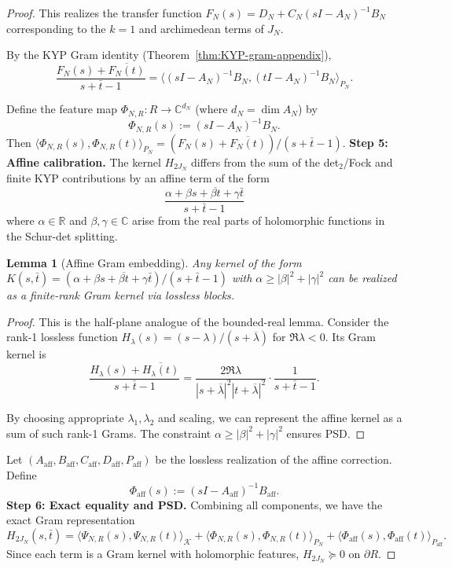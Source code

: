\documentclass[11pt]{article}
\newtheorem{lemma}[theorem]{Lemma}
\theoremstyle{definition}
\theoremstyle{remark}
\begin{document}
\begin{proof}
This realizes the transfer function $F_N(s) = D_N + C_N(sI - A_N)^{-1}B_N$ corresponding to the $k=1$ and archimedean terms of $J_N$.

By the KYP Gram identity (Theorem~\ref{thm:KYP-gram-appendix}),
\[
  \frac{F_N(s) + \overline{F_N(t)}}{s + \bar t - 1} = \langle (sI - A_N)^{-1}B_N, (tI - A_N)^{-1}B_N \rangle_{P_N}.
\]

Define the feature map $\Phi_{N,R}: R \to \mathbb{C}^{d_N}$ (where $d_N = \dim A_N$) by
\[
  \Phi_{N,R}(s) := (sI - A_N)^{-1}B_N.
\]
Then $\langle \Phi_{N,R}(s), \Phi_{N,R}(t) \rangle_{P_N} = (F_N(s) + \overline{F_N(t)})/(s + \bar t - 1)$.
\medskip
\noindent\textbf{Step 5: Affine calibration.}
The kernel $H_{2J_N}$ differs from the sum of the det$_2$/Fock and finite KYP contributions by an affine term of the form
\[
  \frac{\alpha + \beta s + \overline{\beta t} + \gamma \bar t}{s + \bar t - 1}
\]
where $\alpha \in \mathbb{R}$ and $\beta, \gamma \in \mathbb{C}$ arise from the real parts of holomorphic functions in the Schur-det splitting.

\begin{lemma}[Affine Gram embedding]\label{lem:affine-gram-embedding}
Any kernel of the form $K(s,\bar t) = (\alpha + \beta s + \overline{\beta t} + \gamma \bar t)/(s + \bar t - 1)$ with $\alpha \geq |\beta|^2 + |\gamma|^2$ can be realized as a finite-rank Gram kernel via lossless blocks.
\end{lemma}

\begin{proof}
This is the half-plane analogue of the bounded-real lemma.
Consider the rank-1 lossless function $H_\lambda(s) = (s - \lambda)/(s + \overline{\lambda})$ for $\Re \lambda < 0$. Its Gram kernel is
\[
  \frac{H_\lambda(s) + \overline{H_\lambda(t)}}{s + \bar t - 1} = \frac{2\Re \lambda}{|s + \overline{\lambda}|^2 |t + \overline{\lambda}|^2} \cdot \frac{1}{s + \bar t - 1}.
\]

By choosing appropriate $\lambda_1, \lambda_2$ and scaling, we can represent the affine kernel as a sum of such rank-1 Grams. The constraint $\alpha \geq |\beta|^2 + |\gamma|^2$ ensures PSD.
\end{proof}

Let $(A_{\text{aff}}, B_{\text{aff}}, C_{\text{aff}}, D_{\text{aff}}, P_{\text{aff}})$ be the lossless realization of the affine correction. Define
\[
  \Phi_{\text{aff}}(s) := (sI - A_{\text{aff}})^{-1}B_{\text{aff}}.
\]
\medskip
\noindent\textbf{Step 6: Exact equality and PSD.}
Combining all components, we have the exact Gram representation
\[
  H_{2J_N}(s,\bar t) = \langle \Psi_{N,R}(s), \Psi_{N,R}(t) \rangle_{\mathcal{K}} + \langle \Phi_{N,R}(s), \Phi_{N,R}(t) \rangle_{P_N} + \langle \Phi_{\text{aff}}(s), \Phi_{\text{aff}}(t) \rangle_{P_{\text{aff}}}.
\]
Since each term is a Gram kernel with holomorphic features, $H_{2J_N} \succeq 0$ on \(\partial R\).


\end{proof}
\end{document}
